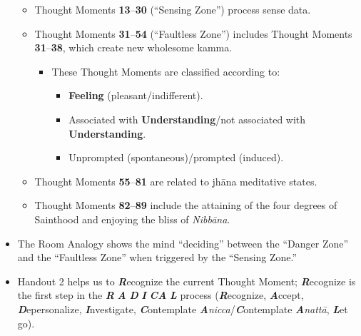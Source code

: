 \begin{itemize}
\begin{itemize}
\begin{itemize}
\end{itemize}

\item Thought Moments \textbf{13}--\textbf{30} (“Sensing Zone”) process sense data.

\item Thought Moments \textbf{31}--\textbf{54} (“Faultless Zone”) includes Thought Moments \textbf{31}--\textbf{38}, which create new wholesome kamma.

\begin{itemize}

\item These Thought Moments are classified according to:

\begin{itemize}

\item \textbf{Feeling} (pleasant/indifferent).

\item Associated with \textbf{Understanding}/not associated with \textbf{Understanding}.

\item Unprompted (spontaneous)/prompted (induced).

\end{itemize}

\end{itemize}

\item Thought Moments \textbf{55}--\textbf{81} are related to jhāna meditative states.

\item Thought Moments \textbf{82}--\textbf{89} include the attaining of the four degrees of Sainthood and enjoying the bliss of \textit{Nibbāna}.

\end{itemize}

\item The Room Analogy shows the mind “deciding” between the “Danger Zone” and the “Faultless Zone” when triggered by the “Sensing Zone.”

\item Handout 2 helps us to \textbf{\textit{R}}ecognize the current Thought Moment; \textbf{\textit{R}}ecognize is the first step in the \textbf{\textit{R}} \textbf{\textit{A}} \textbf{\textit{D}} \textbf{\textit{I}} \textbf{\textit{CA}} \textbf{\textit{L}} process (\textbf{\textit{R}}ecognize, \textbf{\textit{A}}ccept, \textbf{\textit{D}}epersonalize, \textbf{\textit{I}}nvestigate, \textbf{\textit{C}}ontemplate \textbf{\textit{A}}\textit{nicca}/\textbf{\textit{C}}ontemplate \textbf{\textit{A}}\textit{nattā}, \textbf{\textit{L}}et go).

\end{itemize}

